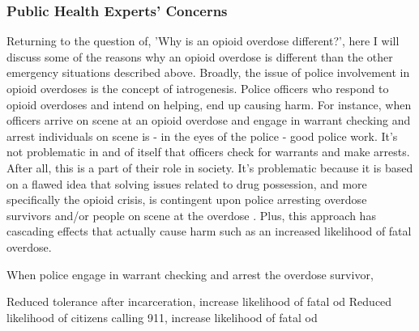 \subsubsection{Public Health Experts’ Concerns} %

Returning to the question of, 'Why is an opioid overdose different?', here I will discuss some of the reasons why an opioid overdose is different than the other emergency situations described above. Broadly, the issue of police involvement in opioid overdoses is the concept of iatrogenesis. Police officers who respond to opioid overdoses and intend on helping, end up causing harm. For instance, when officers arrive on scene at an opioid overdose and engage in warrant checking and arrest individuals on scene is - in the eyes of the police - good police work. It's not problematic in and of itself that officers check for warrants and make arrests. After all, this is a part of their role in society. It's problematic because it is based on a flawed idea that solving issues related to drug possession, and more specifically the opioid crisis, is contingent upon police arresting overdose survivors and/or people on scene at the overdose . Plus, this approach has cascading effects that actually cause harm such as an increased likelihood of fatal overdose.

When police engage in warrant checking and arrest the overdose survivor, 

Reduced tolerance after incarceration, increase likelihood of fatal od
Reduced likelihood of citizens calling 911, increase likelihood of fatal od


